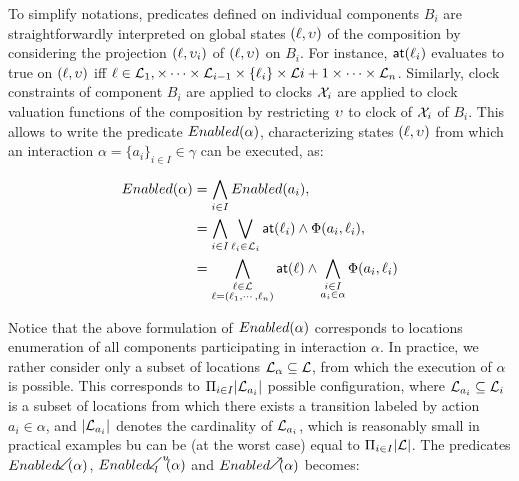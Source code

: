 To simplify notations, predicates defined on individual components $B_i$ are
straightforwardly interpreted on global states $(\ell,\upsilon)$ of the composition
by considering the projection $(\ell,\upsilon_i)$ of $(\ell,\upsilon)$ on $B_i$.
For instance, $\textsf{at}(\ell_i)$ evaluates to true on $(\ell,\upsilon)$ iff
$\ell\in\mathcal{L}_1,\times\cdots\times\mathcal{L}_{i-1}\times\{\ell_i\}\times\mathcal{L}{i+1}\times
\cdots\times\mathcal{L}_n$. Similarly, clock constraints of component $B_i$ are applied
to clocks $\mathcal{X}_i$ are applied to clock valuation functions of the composition
by restricting $\upsilon$ to clock of $\mathcal{X}_i$ of $B_i$. This allows to write
the predicate $Enabled(\alpha)$, characterizing states $(\ell,\upsilon)$ from which 
an interaction $\alpha=\{a_i\}_{i\in{I}}\in\gamma$ can be executed, as:

\begin{align*}
  Enabled(\alpha)&=\bigwedge_{i\in{I}}Enabled(a_i),\\
                  &=\bigwedge_{i\in{I}}\bigvee_{\ell_i\in\mathcal{L}_i}\textsf{at}(\ell_i)\wedge
                  \Phi(a_i,\ell_i),\\
                  &=\bigwedge_{\substack{\ell\in\mathcal{L}\\ 
                  \ell=(\ell_1,\cdots,\ell_n)}}\textsf{at}(\ell)\wedge
                  \bigwedge_{\substack{i\in I\\ a_i\in\alpha }}\Phi(a_i,\ell_i)
\end{align*}

Notice that the above formulation of $Enabled(\alpha)$ corresponds to locations 
enumeration of all components participating in interaction $\alpha$. In practice,
we rather consider only a subset of locations $\mathcal{L}_{\alpha}\subseteq\mathcal{L}$, from
which the execution of $\alpha$ is possible. This corresponds to $\Pi_{i\in{I}}
|\mathcal{L}_{a_i}|$ possible configuration, where $\mathcal{L}_{a_i}\subseteq\mathcal{L}_i$ is a subset
of locations from which there exists a transition labeled by action $a_i\in\alpha$,
and $|\mathcal{L}_{a_i}|$ denotes the cardinality of $\mathcal{L}_{a_i}$, which is reasonably
small in practical examples bu can be (at the worst case) equal to $\Pi_{i\in{I}}
|\mathcal{L}|$. The predicates $\enabledbackward{\alpha}$, 
$\enabledbackwardb{\alpha}{l}{u}$ and $\enabledforward{\alpha}$ becomes:

